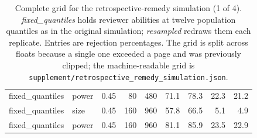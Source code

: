 \begin{table}[p]
\begin{tabular}{@{}llrrrrrrr@{}}
fixed\_quantiles & power & 0.45 & 80 & 480 & 71.1 & 78.3 & 22.3 & 21.2 \\
fixed\_quantiles & size & 0.45 & 160 & 960 & 57.8 & 66.5 & 5.1 & 4.9 \\
fixed\_quantiles & power & 0.45 & 160 & 960 & 81.1 & 85.9 & 23.5 & 22.9 \\
\bottomrule
\end{tabular}
\caption{Complete grid for the retrospective-remedy simulation (1 of 4). \emph{fixed\_quantiles} holds reviewer abilities at twelve population quantiles as in the original simulation; \emph{resampled} redraws them each replicate. Entries are rejection percentages. The grid is split across floats because a single one exceeded a page and was previously clipped; the machine-readable grid is \texttt{supplement/retrospective\_remedy\_simulation.json}.}
\label{tab:retrospective-remedies-full}
\end{table}

